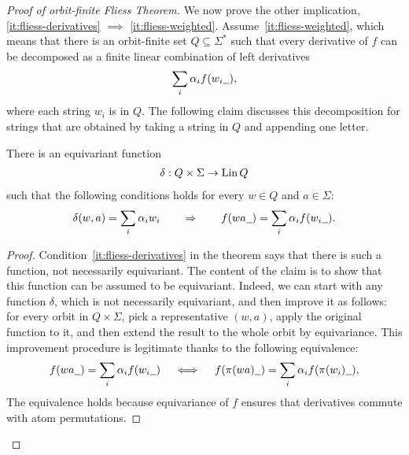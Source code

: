 \begin{proof}[Proof of orbit-finite Fliess Theorem]
    We now prove the other implication, \ref{it:fliess-derivatives} $\implies$ \ref{it:fliess-weighted}. Assume~\ref{it:fliess-weighted}, which means that   there is an orbit-finite set $Q \subseteq \Sigma^*$ such that every derivative of $f$ can be decomposed as a finite linear combination of left derivatives
    \begin{align*}
            \sum_i \alpha_i f(w_i\underline{\hspace{2mm}}),
        \end{align*}
        where each string $w_i$ is in $Q$. The following claim discusses this decomposition for strings that are obtained by taking a string in $Q$ and appending one letter. 
        \begin{claim}
            There is an equivariant function 
        \begin{align*}
       \delta :  Q \times \Sigma \to \operatorname{Lin} Q
        \end{align*}
        such that the following conditions holds for every $w \in Q$ and $a \in \Sigma$:
        \begin{align*}
        \delta(w,a) = 
        \sum_i \alpha_i w_i 
        \qquad \Rightarrow \qquad 
        f(wa\underline{\hspace{2mm}}) = \sum_i \alpha_i f(w_i\underline{\hspace{2mm}}).
        \end{align*}
        \end{claim}
    \begin{proof}
        Condition~\ref{it:fliess-derivatives} in the theorem says that there is such a function, not necessarily equivariant. The content of the claim is to show that this function can be assumed to be equivariant. Indeed, we can start with any function $\delta$, which is not necessarily equivariant, and then improve it as follows:  for every orbit in $Q \times \Sigma$,  pick a representative $(w,a)$, apply the original function to it, and then extend the result to the whole orbit by equivariance. This improvement  procedure is legitimate thanks to the following equivalence: 
        \begin{align*}
                    f(wa\underline{\hspace{2mm}}) = \sum_i \alpha_i f(w_i\underline{\hspace{2mm}})
                    \quad \iff \quad 
                            f(\pi(wa)\underline{\hspace{2mm}}) = \sum_i \alpha_i f(\pi(w_i)\underline{\hspace{2mm}}),
        \end{align*}
        The equivalence holds  because equivariance of $f$ ensures that  derivatives commute with atom permutations.
    \end{proof}        


\end{proof}
